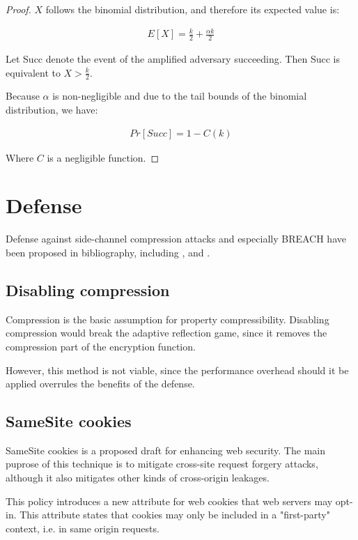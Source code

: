 \documentclass{sig-alternate-05-2015}
\begin{document}
\begin{proof}
$X$ follows the binomial distribution, and therefore its expected value is:

\begin{align*}
    E[X] = \frac{k}{2} + \frac{\alpha k}{2}
\end{align*}

Let Succ denote the event of the amplified adversary succeeding. Then Succ
is equivalent to $X > \frac{k}{2}$.

Because $\alpha$ is non-negligible and due to the tail bounds of the binomial
distribution, we have:

\begin{align*}
    Pr[Succ] = 1 - C(k)
\end{align*}

Where $C$ is a negligible function.
\end{proof}

\section{Defense}\label{sec:defense}

Defense against side-channel compression attacks and especially BREACH have been
proposed in bibliography, including \cite{c3}, \cite{c5} and \cite{c6}.

\subsection{Disabling compression}\label{subsec:disablecom}
Compression is the basic assumption for property compressibility. Disabling
compression would break the adaptive reflection game, since it removes
the compression part of the encryption function.

However, this method is not viable, since the performance overhead should it be
applied overrules the benefits of the defense.

\subsection{SameSite cookies}\label{subsec:samesite}
SameSite cookies \cite{c10} is a proposed draft for enhancing web security. The
main puprose of this technique is to mitigate cross-site request forgery
attacks, although it also mitigates other kinds of cross-origin leakages.

This policy introduces a new attribute for web cookies that web servers may
opt-in. This attribute states that cookies may only be included in a
"first-party" context, i.e. in same origin requests.
\end{document}
